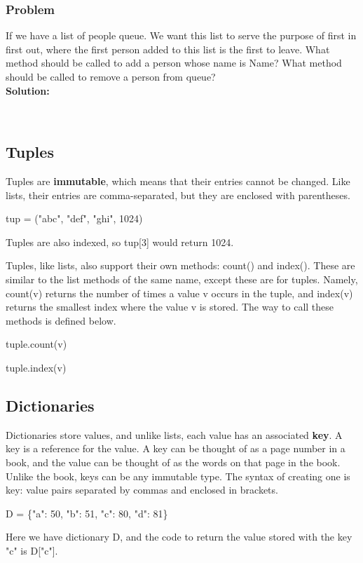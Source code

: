 \documentclass{article}
\newcommand{\define}[1]{\begin{center}\ttfamily #1\end{center}}
\newcommand{\icode}[1]{{\ttfamily #1}}
\begin{document}
\subsubsection{Problem}
If we have a list of people \icode{queue}. We want this list to serve the purpose of first in first out, where the first person added to this list is the first to leave. What method should be called to add a person whose name is \icode{Name}? What method should be called to remove a person from \icode{queue}?\\[.2 cm]
\noindent\textbf{Solution:}

\begin{tcolorbox}[colback=writing]
	\ttfamily \phantom{queue.append("Name")}\\
	\phantom{queue.pop(0)}
\end{tcolorbox}


\subsection{Tuples}
Tuples are \textbf{immutable}, which means that their entries cannot be changed. Like lists, their entries are comma-separated, but they are enclosed with parentheses.
\define{tup = ("abc", "def", "ghi", 1024)}
Tuples are also indexed, so {\ttfamily tup[3]} would return 1024.

Tuples, like lists, also support their own methods: {\ttfamily count()} and {\ttfamily index()}. These are similar to the list methods of the same name, except these are for tuples. Namely, {\ttfamily count(v)} returns the number of times a value {\ttfamily v} occurs in the tuple, and {\ttfamily index(v)} returns the smallest index where the value {\ttfamily v} is stored. The way to call these methods is defined below.
\define{tuple.count(v)}
\define{tuple.index(v)}

\subsection{Dictionaries}
Dictionaries store values, and unlike lists, each value has an associated \textbf{key}. A key is a reference for the value. A key can be thought of as a page number in a book, and the value can be thought of as the words on that page in the book. Unlike the book, keys can be any immutable type. The syntax of creating one is {\ttfamily key: value} pairs separated by commas and enclosed in brackets.
\define{D = \{"a": 50, "b": 51, "c": 80, "d": 81\}}
Here we have dictionary \icode{D}, and the code to return the value stored with the key \icode{"c"} is \icode{D["c"]}.
\end{document}
